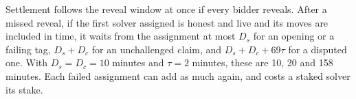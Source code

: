 Settlement follows the reveal window at once if every bidder reveals. After a missed reveal, if the first solver assigned is honest and live and its moves are included in time, it waits from the assignment at most $D_s$ for an opening or a failing tag, $D_s + D_c$ for an unchallenged claim, and $D_s + D_c + 69\tau$ for a disputed one. With $D_s = D_c = 10$ minutes and $\tau = 2$ minutes, these are 10, 20 and 158 minutes. Each failed assignment can add as much again, and costs a staked solver its stake.
